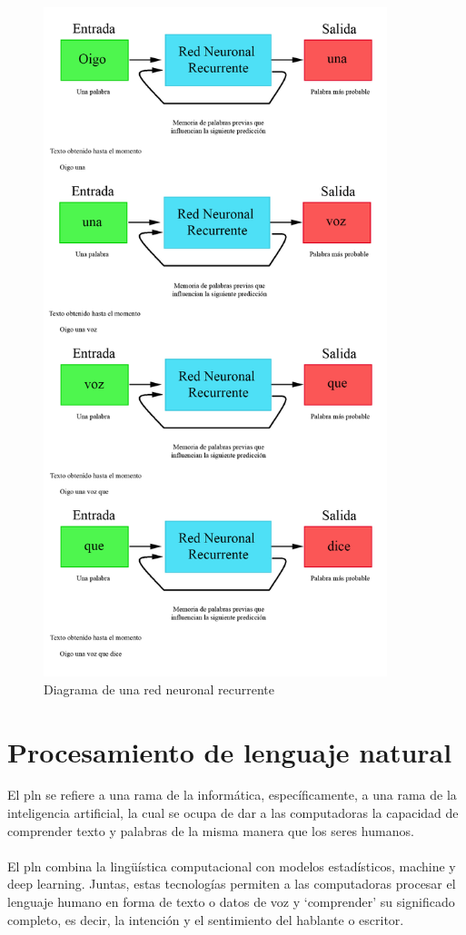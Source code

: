 \documentclass[12pt, a4paper, titlepage]{report}
\begin{document}
				\begin{figure}[H] 
					\includegraphics[width=10cm]{./imagenes/MarcoTeorico/RedesN/Recurrente.png}
					\centering 
					\caption{Diagrama de una red neuronal recurrente}
				\end{figure}		
        
        \section{Procesamiento de lenguaje natural}
        
        El \acrfull{pln} se refiere a una rama de la informática, específicamente, a una rama de la inteligencia artificial, la cual se ocupa de dar a las computadoras la capacidad de comprender texto y palabras de la misma manera que los seres humanos.\\\\
        El \acrshort{pln} combina la lingüística computacional con modelos estadísticos, machine y deep learning. Juntas, estas tecnologías permiten a las computadoras procesar el lenguaje humano en forma de texto o datos de voz y `comprender' su significado completo, es decir, la intención y el sentimiento del hablante o escritor. \cite{refProcesamientoLN}
        
\end{document}
